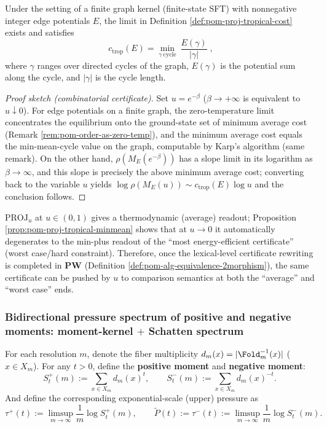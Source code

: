 \begin{proposition}[Tropical limit = minimum mean cycle energy]\label{prop:pom-proj-tropical-minmean}
Under the setting of a finite graph kernel (finite-state SFT) with nonnegative integer edge potentials \(E\), the limit in Definition \ref{def:pom-proj-tropical-cost} exists and satisfies
$$
\boxed{\;
c_{\mathrm{trop}}(E)
=
\min_{\gamma\ \mathrm{cycle}}\ \frac{E(\gamma)}{|\gamma|}\;},
$$
where \(\gamma\) ranges over directed cycles of the graph, \(E(\gamma)\) is the potential sum along the cycle, and \(|\gamma|\) is the cycle length.
\end{proposition}
\begin{proof}[Proof sketch (combinatorial certificate)]
Set \(u=e^{-\beta}\) (\(\beta\to+\infty\) is equivalent to \(u\downarrow 0\)).
For edge potentials on a finite graph, the zero-temperature limit concentrates the equilibrium onto the ground-state set of minimum average cost (Remark \ref{rem:pom-order-as-zero-temp}), and the minimum average cost equals the min-mean-cycle value on the graph, computable by Karp's algorithm (same remark). On the other hand, \(\rho(M_E(e^{-\beta}))\) has a slope limit in its logarithm as \(\beta\to\infty\), and this slope is precisely the above minimum average cost; converting back to the variable \(u\) yields
\(
\log\rho(M_E(u))\sim c_{\mathrm{trop}}(E)\log u
\)
and the conclusion follows.
\end{proof}

\begin{remark}\label{rem:pom-proj-avg-worst-unified}
\(\mathrm{PROJ}_u\) at \(u\in(0,1)\) gives a thermodynamic (average) readout; Proposition \ref{prop:pom-proj-tropical-minmean} shows that at \(u\to 0\) it automatically degenerates to the min-plus readout of the ``most energy-efficient certificate'' (worst case/hard constraint). Therefore, once the lexical-level certificate rewriting is completed in \(\mathbf{PW}\) (Definition \ref{def:pom-alg-equivalence-2morphism}), the same certificate can be pushed by \(u\) to comparison semantics at both the ``average'' and ``worst case'' ends.
\end{remark}

\subsubsection{Bidirectional pressure spectrum of positive and negative moments: moment-kernel \texorpdfstring{$+$}{+} Schatten spectrum}\label{subsec:pom-bidirectional-pressure}
\begin{definition}\label{def:pom-bidirectional-moments}
For each resolution \(m\), denote the fiber multiplicity \(d_m(x)=|\Fold_m^{-1}(x)|\) (\(x\in X_m\)).
For any \(t>0\), define the \textbf{positive moment} and \textbf{negative moment}:
$$
S^{+}_{t}(m):=\sum_{x\in X_m} d_m(x)^{t},
\qquad
S^{-}_{t}(m):=\sum_{x\in X_m} d_m(x)^{-t}.
$$
And define the corresponding exponential-scale (upper) pressure as
$$
\tau^{+}(t):=\limsup_{m\to\infty}\frac{1}{m}\log S^{+}_{t}(m),
\qquad
\widetilde P(t):=\tau^{-}(t):=\limsup_{m\to\infty}\frac{1}{m}\log S^{-}_{t}(m).
$$
\end{definition}

